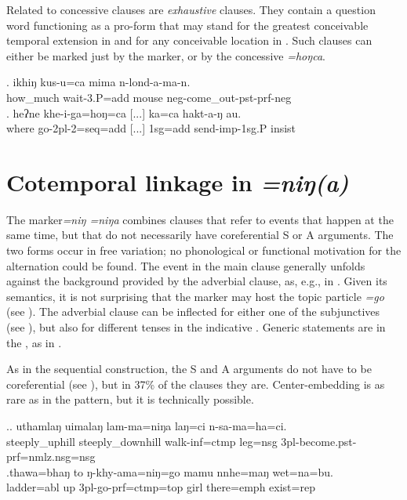 Related to concessive clauses are \emph{exhaustive} clauses. They contain a question word functioning as a pro-form that may stand for the greatest conceivable temporal extension in \Next[a] and for any conceivable location in \Next[b]. Such clauses can either be marked just by the  marker, or by the concessive \emph{=hoŋca}.
 
 \exg. ikhiŋ   kus-u=ca                        mima  n-lond-a-ma-n.\\
 how\_much wait{\sc -3.P=add} mouse {\sc neg-}come\_out{\sc -pst-prf-neg}\\
  
\bg. heʔne khe-i-ga=hoŋ=ca      [...]         ka=ca         hakt-a-ŋ          au.\\
where go{\sc -2pl-2=seq=add} [...] {\sc 1sg=add} send{\sc -imp-1sg.P} {\sc insist}\\
 


\section{Cotemporal linkage in \emph{=niŋ(a)}}\label{sim-finite}

The   marker\emph{=niŋ \ti =niŋa} combines clauses that refer to  events that happen at the same time, but that do not necessarily have coreferential S or A arguments. The two forms occur in free variation; no phonological or functional motivation for the alternation could be found. The event in the main clause generally unfolds against the background provided by the adverbial clause, as, e.g., in \Next. Given its semantics, it is not surprising that the marker may  host the  topic particle \emph{=go} (see \Next[b]). The adverbial clause can be inflected for either one of the subjunctives (see ), but also for different  tenses in the indicative . Generic statements are in the , as in  \Next[a].

As in the sequential construction, the S and A arguments do not have to be coreferential (see \Next), but in 37\% of the clauses they are. Center-embedding is as rare as in the  pattern, but it is technically possible.

 \ex.\ag. uthamlaŋ uimalaŋ lam-ma=niŋa laŋ=ci n-sa-ma=ha=ci.\\
		steeply\_uphill steeply\_downhill walk{\sc -inf=ctmp} leg{\sc =nsg} {\sc 3pl-}become{\sc .pst-prf=nmlz.nsg=nsg}\\ 
	\bg.thawa=bhaŋ    to  ŋ-khy-ama=niŋ=go                    mamu nnhe=maŋ    wet=na=bu.\\
ladder{\sc =abl} up {\sc 3pl-}go{\sc -prf=ctmp=top} girl there{\sc =emph} exist{\sc [3sg]=rep}\\
 


